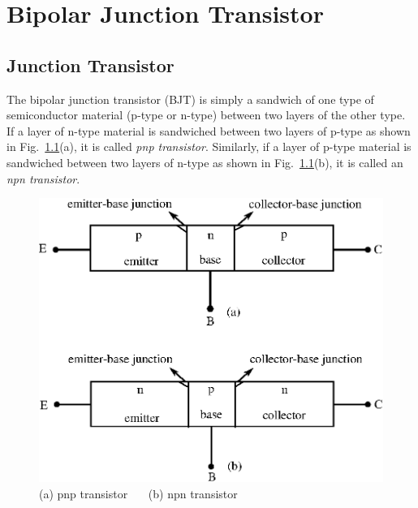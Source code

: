 \makeatletter
\def\@makechapterhead#1{%
  \vspace*{10\p@}%
  {\parindent \z@ \raggedleft \normalfont
    \ifnum \c@secnumdepth >\m@ne
      \if@mainmatter
        \LARGE\bfseries \@chapapp\space \thechapter
	\vskip 4pt
        \hrule height 2pt
        \par\nobreak
        \vskip 5\p@
      \fi
    \fi
    \interlinepenalty\@M
    \huge \bfseries #1\par\nobreak
\vskip 5pt

\hrule height 2pt   
 \vskip 10\p@  
  }}
\makeatother

\chapter{Bipolar Junction Transistor}\label{chap2}

\medskip
\section{Junction Transistor}\label{sec2.1}

The bipolar junction transistor (BJT) is simply a sandwich of one type of semiconductor material (p-type or n-type) between two layers of the other type. If a layer of n-type material is sandwiched between two layers of p-type as shown in Fig.~\ref{fig2.1}(a), it is called {\em pnp transistor}. Similarly, if a layer of p-type material is sandwiched between two layers of n-type as shown in Fig.~\ref{fig2.1}(b), it is called an {\em npn transistor}.
\begin{figure}[H]
\centering
\includegraphics{chap2/fig1.eps}
\caption{(a) pnp transistor~~~ (b) npn transistor}\label{fig2.1}
\end{figure}

